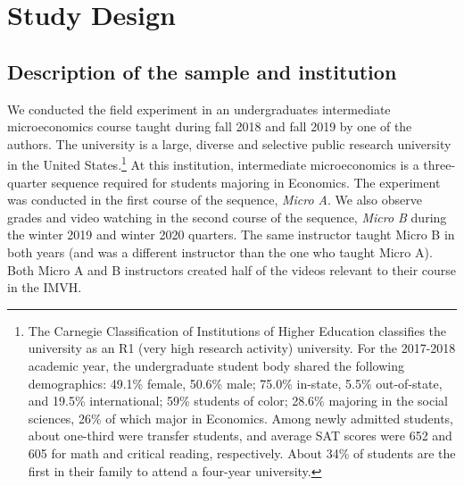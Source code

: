 \documentclass[12pt]{article}
\begin{document}

\section{Study Design} \label{studydesign}

\subsection{Description of the sample and institution}

We conducted the field experiment in an undergraduates intermediate microeconomics course taught during fall 2018 and fall 2019 by one of the authors. The university is a large, diverse and selective public research university in the United States.\footnote{The Carnegie Classification of Institutions of Higher Education classifies the university as an R1 (very high research activity) university. For the 2017-2018 academic year, the undergraduate student body shared the following demographics: 49.1\% female, 50.6\% male; 75.0\% in-state, 5.5\% out-of-state, and 19.5\% international; 59\% students of color; 28.6\% majoring in the social sciences, 26\% of which major in Economics. Among newly admitted students, about one-third were transfer students, and average SAT scores were 652 and 605 for math and critical reading, respectively. About 34\% of students are the first in their family to attend a four-year university.} At this institution, intermediate microeconomics is a three-quarter sequence required for students majoring in Economics. The experiment was conducted in the first course of the sequence, \textit{Micro A}. We also observe grades and video watching in the second course of the sequence, \textit{Micro B} during the winter 2019 and winter 2020 quarters. The same instructor taught Micro B in both years (and was a different instructor than the one who taught Micro A). Both Micro A and B instructors created half of the videos relevant to their course in the IMVH.

\end{document}
